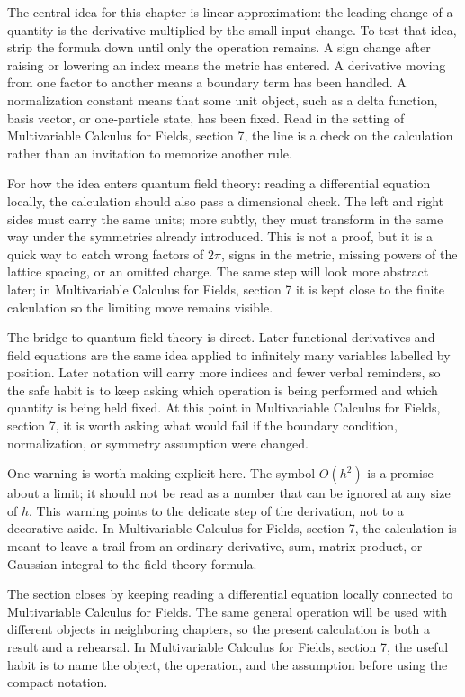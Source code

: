 The central idea for this chapter is linear approximation: the leading change of a quantity is the derivative multiplied by the small input change.  To test that idea, strip the formula down until only the operation remains.  A sign change after raising or lowering an index means the metric has entered.  A derivative moving from one factor to another means a boundary term has been handled.  A normalization constant means that some unit object, such as a delta function, basis vector, or one-particle state, has been fixed.  Read in the setting of Multivariable Calculus for Fields, section 7, the line is a check on the calculation rather than an invitation to memorize another rule.

For how the idea enters quantum field theory: reading a differential equation locally, the calculation should also pass a dimensional check.  The left and right sides must carry the same units; more subtly, they must transform in the same way under the symmetries already introduced.  This is not a proof, but it is a quick way to catch wrong factors of \(2\pi\), signs in the metric, missing powers of the lattice spacing, or an omitted charge.  The same step will look more abstract later; in Multivariable Calculus for Fields, section 7 it is kept close to the finite calculation so the limiting move remains visible.

The bridge to quantum field theory is direct.  Later functional derivatives and field equations are the same idea applied to infinitely many variables labelled by position.  Later notation will carry more indices and fewer verbal reminders, so the safe habit is to keep asking which operation is being performed and which quantity is being held fixed.  At this point in Multivariable Calculus for Fields, section 7, it is worth asking what would fail if the boundary condition, normalization, or symmetry assumption were changed.

One warning is worth making explicit here.  The symbol \(O(h^2)\) is a promise about a limit; it should not be read as a number that can be ignored at any size of \(h\).  This warning points to the delicate step of the derivation, not to a decorative aside.  In Multivariable Calculus for Fields, section 7, the calculation is meant to leave a trail from an ordinary derivative, sum, matrix product, or Gaussian integral to the field-theory formula.

The section closes by keeping reading a differential equation locally connected to Multivariable Calculus for Fields.  The same general operation will be used with different objects in neighboring chapters, so the present calculation is both a result and a rehearsal.  In Multivariable Calculus for Fields, section 7, the useful habit is to name the object, the operation, and the assumption before using the compact notation.



